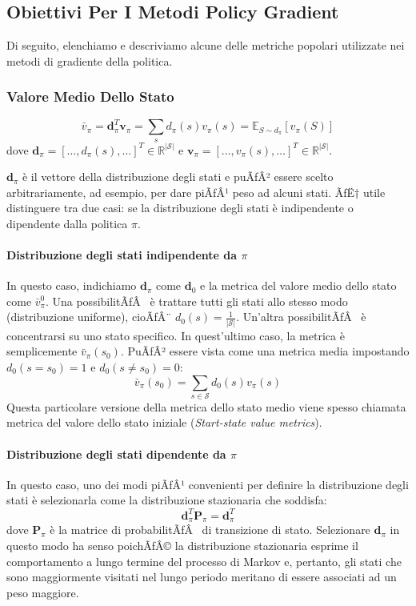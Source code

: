 ﻿\documentclass[11pt, a4paper]{report}
\begin{document}
\subsection{Obiettivi Per I Metodi Policy Gradient}
Di seguito, elenchiamo e descriviamo alcune delle metriche popolari utilizzate nei metodi di gradiente della politica.

\subsubsection{Valore Medio Dello Stato}
\begin{equation}
\bar{v}_{\pi} = \bm{d}_{\pi}^T \bm{v}_{\pi} = \sum_s d_{\pi}(s) v_{\pi}(s) = \mathbb{E}_{S \sim d_{\pi}} [v_{\pi}(S)]
\end{equation}
dove $\bm{d}_{\pi} = [\dots, d_{\pi}(s), \dots]^T \in \mathbb{R}^{|\mathcal{S}|}$ e $\bm{v}_{\pi} = [\dots, v_{\pi}(s), \dots]^T \in \mathbb{R}^{|\mathcal{S}|}$.

$\bm{d}_{\pi}$ è il vettore della distribuzione degli stati e puÃƒÂ² essere scelto arbitrariamente, ad esempio, per dare piÃƒÂ¹ peso ad alcuni stati. ÃƒË† utile distinguere tra due casi: se la distribuzione degli stati è indipendente o dipendente dalla politica $\pi$.

\paragraph{Distribuzione degli stati indipendente da $\pi$}
In questo caso, indichiamo $\bm{d}_{\pi}$ come $\bm{d}_0$ e la metrica del valore medio dello stato come $\bar{v}_{\pi}^0$. Una possibilitÃƒÂ  è trattare tutti gli stati allo stesso modo (distribuzione uniforme), cioÃƒÂ¨ $d_0(s) = \frac{1}{|\mathcal{S}|}$. Un'altra possibilitÃƒÂ  è concentrarsi su uno stato specifico. In quest'ultimo caso, la metrica è semplicemente $\bar{v}_{\pi}(s_0)$. PuÃƒÂ² essere vista come una metrica media impostando $d_0(s = s_0) = 1$ e $d_0(s \neq s_0) = 0$:
\begin{equation}
\bar{v}_{\pi}(s_0) = \sum_{s \in \mathcal{S}} d_0(s) v_{\pi}(s)
\end{equation}
Questa particolare versione della metrica dello stato medio viene spesso chiamata metrica del valore dello stato iniziale (\emph{Start-state value metrics}).

\paragraph{Distribuzione degli stati dipendente da $\pi$}
In questo caso, uno dei modi piÃƒÂ¹ convenienti per definire la distribuzione degli stati è selezionarla come la distribuzione stazionaria che soddisfa:
\begin{equation}
\bm{d}_{\pi}^T \bm{P}_{\pi} = \bm{d}_{\pi}^T
\end{equation}
dove $\bm{P}_{\pi}$ è la matrice di probabilitÃƒÂ  di transizione di stato. Selezionare $\bm{d}_{\pi}$ in questo modo ha senso poichÃƒÂ© la distribuzione stazionaria esprime il comportamento a lungo termine del processo di Markov e, pertanto, gli stati che sono maggiormente visitati nel lungo periodo meritano di essere associati ad un peso maggiore.
\end{document}
